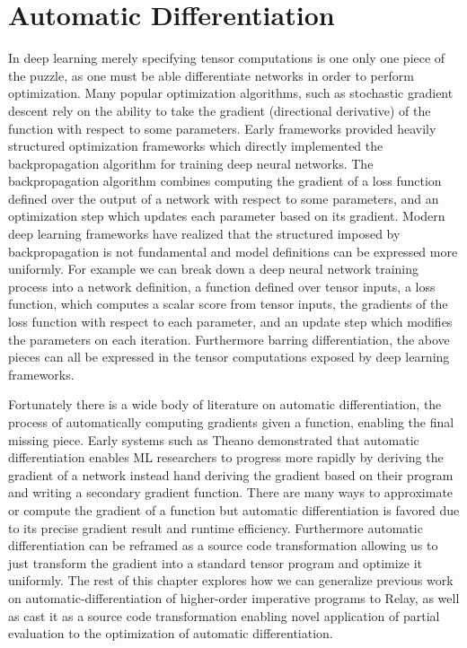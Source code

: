 \chapter{Automatic Differentiation}
\label{ch:ad}

In deep learning merely specifying tensor computations is
  one only one piece of the puzzle, as one must be able
  differentiate networks in order to perform optimization.
Many popular optimization algorithms,
  such as stochastic gradient descent
  rely on the ability to take
  the gradient (directional derivative) of the function with
  respect to some parameters.
Early frameworks provided heavily structured optimization frameworks
  which directly implemented the backpropagation algorithm for training
  deep neural networks.
The backpropagation algorithm combines
  computing the gradient of a loss function defined over the
  output of a network with respect to some parameters, and an
  optimization step which updates each parameter based on its
  gradient.
Modern deep learning frameworks have realized that the
  structured imposed by backpropagation is not fundamental
  and model definitions can be expressed more uniformly.
For example we can break down a deep neural network training
  process into a network definition, a function defined over tensor inputs,
  a loss function, which computes a scalar score from tensor
  inputs, the gradients of the loss function with respect to each parameter,
  and an update step which modifies the parameters on each iteration.
Furthermore barring differentiation, the above pieces can all be expressed
  in the tensor computations exposed by deep learning frameworks.

Fortunately there is a wide body of literature on automatic differentiation,
  the process of automatically computing gradients given a function,
  enabling the final missing piece.
Early systems such as Theano demonstrated that automatic
  differentiation enables ML researchers to progress more rapidly
  by deriving the gradient of a network instead hand deriving
  the gradient based on their program and writing a secondary gradient function.
There are many ways to approximate or compute the gradient of a function
  but automatic differentiation is favored due to its precise gradient
  result and runtime efficiency.
Furthermore automatic differentiation can be reframed as a source
  code transformation allowing us to just transform the gradient
  into a standard tensor program and optimize it uniformly.
The rest of this chapter explores how we can generalize previous
  work on automatic-differentiation of higher-order imperative programs
  to Relay, as well as cast it as a source code transformation enabling
  novel application of partial evaluation to the optimization of automatic
  differentiation.


